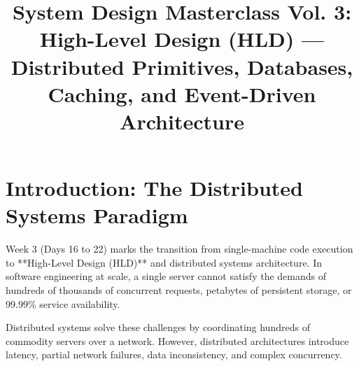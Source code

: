\documentclass[10pt,journal,compsoc,onecolumn]{IEEEtran}
\begin{document}
\title{System Design Masterclass Vol. 3: High-Level Design (HLD) --- Distributed Primitives, Databases, Caching, and Event-Driven Architecture}


\maketitle
\IEEEdisplaynontitleabstractindextext
\IEEEpeerreviewmaketitle

\section{Introduction: The Distributed Systems Paradigm}
\label{sec:intro_vol3}

Week 3 (Days 16 to 22) marks the transition from single-machine code execution to **High-Level Design (HLD)** and distributed systems architecture. In software engineering at scale, a single server cannot satisfy the demands of hundreds of thousands of concurrent requests, petabytes of persistent storage, or 99.99\% service availability.

Distributed systems solve these challenges by coordinating hundreds of commodity servers over a network. However, distributed architectures introduce latency, partial network failures, data inconsistency, and complex concurrency. 
\end{document}
